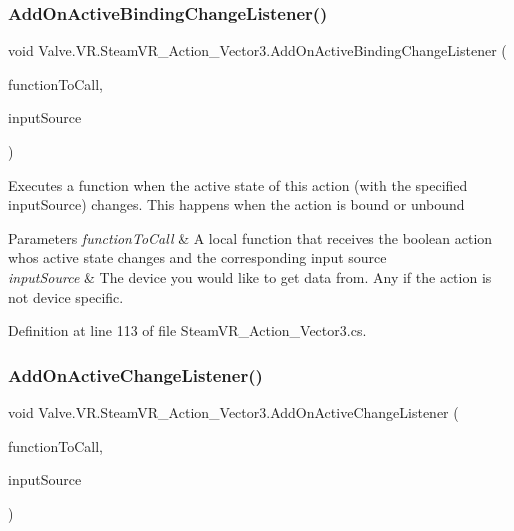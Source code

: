 \subsubsection{\texorpdfstring{AddOnActiveBindingChangeListener()}{AddOnActiveBindingChangeListener()}}
{\footnotesize\ttfamily void Valve.\+V\+R.\+Steam\+V\+R\+\_\+\+Action\+\_\+\+Vector3.\+Add\+On\+Active\+Binding\+Change\+Listener (\begin{DoxyParamCaption}\item[{\mbox{\hyperlink{class_valve_1_1_v_r_1_1_steam_v_r___action___vector3_a47d6c1c558fb45841cd626df9ab3dcb9}{Active\+Change\+Handler}}}]{function\+To\+Call,  }\item[{\mbox{\hyperlink{namespace_valve_1_1_v_r_a82e5bf501cc3aa155444ee3f0662853f}{Steam\+V\+R\+\_\+\+Input\+\_\+\+Sources}}}]{input\+Source }\end{DoxyParamCaption})}



Executes a function when the active state of this action (with the specified input\+Source) changes. This happens when the action is bound or unbound 


\begin{DoxyParams}{Parameters}
{\em function\+To\+Call} & A local function that receives the boolean action who\textquotesingle{}s active state changes and the corresponding input source\\
\hline
{\em input\+Source} & The device you would like to get data from. Any if the action is not device specific.\\
\hline
\end{DoxyParams}


Definition at line 113 of file Steam\+V\+R\+\_\+\+Action\+\_\+\+Vector3.\+cs.

\mbox{\label{class_valve_1_1_v_r_1_1_steam_v_r___action___vector3_a0550e34179c1058ff63dea2e2305133e}} 
\subsubsection{\texorpdfstring{AddOnActiveChangeListener()}{AddOnActiveChangeListener()}}
{\footnotesize\ttfamily void Valve.\+V\+R.\+Steam\+V\+R\+\_\+\+Action\+\_\+\+Vector3.\+Add\+On\+Active\+Change\+Listener (\begin{DoxyParamCaption}\item[{\mbox{\hyperlink{class_valve_1_1_v_r_1_1_steam_v_r___action___vector3_a47d6c1c558fb45841cd626df9ab3dcb9}{Active\+Change\+Handler}}}]{function\+To\+Call,  }\item[{\mbox{\hyperlink{namespace_valve_1_1_v_r_a82e5bf501cc3aa155444ee3f0662853f}{Steam\+V\+R\+\_\+\+Input\+\_\+\+Sources}}}]{input\+Source }\end{DoxyParamCaption})}



